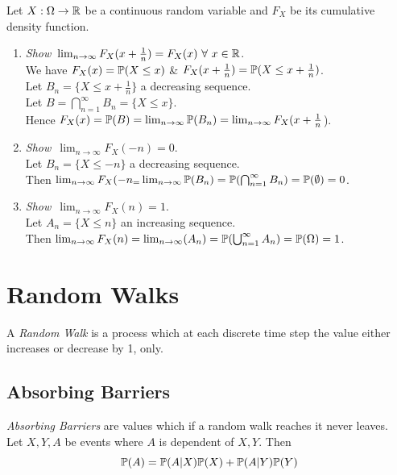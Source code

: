 \documentclass[11pt,a4paper]{article}
\begin{document}
Let $X:\Omega\to\mathbb{R}$ be a continuous random variable and $F_X$ be its cumulative density function.\\
\begin{enumerate}[label=\roman*)]
	\item \textit{Show\ }$\lim_{n\to\infty}F_X(x+\frac{1}{n})=F_X(x)\ \forall\ x\in\real$.\\
	We have $F_X(x)=\mathbb{P}(X\leq x)$ \& $F_X(x+\frac{1}{n})=\mathbb{P}(X\leq x+\frac{1}{n})$.\\
	Let $B_n=\{X\leq x+\frac{1}{n}\}$ a decreasing sequence.\\
	Let $B=\bigcap\limits_{n=1}^\infty B_n=\{X\leq x\}$.\\
	Hence $F_X(x)=\mathbb{P}(B)=\lim_{n\to\infty}\mathbb{P}(B_n)=\lim_{n\to\infty}F_X(x+\frac{1}{n}$).
	\item \textit{Show\ }$\lim_{n\to\infty}F_X(-n)=0$.\\
	Let $B_n=\{X\leq-n\}$ a decreasing sequence.\\
	Then $\lim_{n\to\infty}F_X(-n_=\lim_{n\to\infty}\mathbb{P}(B_n)=\mathbb{P}(\bigcap_{n=1}^\infty B_n)=\mathbb{P}(\emptyset)=0$.
	\item \textit{Show\ }$\lim_{n\to\infty}F_X(n)=1$.\\
	Let $A_n=\{X\leq n\}$ an increasing sequence.\\
	Then $\lim_{n\to\infty}F_X(n)=\lim_{n\to\infty}(A_n)=\mathbb{P}(\bigcup_{n=1}^\infty A_n)=\mathbb{P}(\Omega)=1$.
\end{enumerate}

\section{Random Walks}

A \textit{Random Walk} is a process which at each discrete time step the value either increases or decrease by 1, only.\\

\subsection{Absorbing Barriers}

\textit{Absorbing Barriers} are values which if a random walk reaches it never leaves.\\

Let $X,Y,A$ be events where $A$ is dependent of $X,Y$. Then
$$\mathbb{P}(A)=\mathbb{P}(A|X)\mathbb{P}(X)+\mathbb{P}(A|Y)\mathbb{P}(Y)$$
\end{document}
